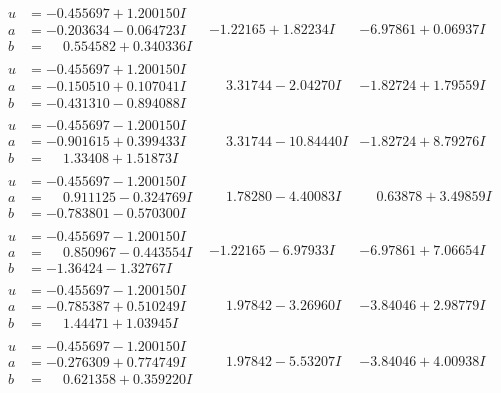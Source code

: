\documentclass[1p]{elsarticle_modified}
\theoremstyle{definition}
\begin{document}
$$\begin{array}{c|c|c}
\begin{aligned}
u &= -0.455697 + 1.200150 I \\
a &= -0.203634 - 0.064723 I \\
b &= \phantom{-}0.554582 + 0.340336 I\end{aligned}
 & -1.22165 + 1.82234 I & -6.97861 + 0.06937 I \\ \hline\begin{aligned}
u &= -0.455697 + 1.200150 I \\
a &= -0.150510 + 0.107041 I \\
b &= -0.431310 - 0.894088 I\end{aligned}
 & \phantom{-}3.31744 - 2.04270 I & -1.82724 + 1.79559 I \\ \hline\begin{aligned}
u &= -0.455697 - 1.200150 I \\
a &= -0.901615 + 0.399433 I \\
b &= \phantom{-}1.33408 + 1.51873 I\end{aligned}
 & \phantom{-}3.31744 - 10.84440 I & -1.82724 + 8.79276 I \\ \hline\begin{aligned}
u &= -0.455697 - 1.200150 I \\
a &= \phantom{-}0.911125 - 0.324769 I \\
b &= -0.783801 - 0.570300 I\end{aligned}
 & \phantom{-}1.78280 - 4.40083 I & \phantom{-}0.63878 + 3.49859 I \\ \hline\begin{aligned}
u &= -0.455697 - 1.200150 I \\
a &= \phantom{-}0.850967 - 0.443554 I \\
b &= -1.36424 - 1.32767 I\end{aligned}
 & -1.22165 - 6.97933 I & -6.97861 + 7.06654 I \\ \hline\begin{aligned}
u &= -0.455697 - 1.200150 I \\
a &= -0.785387 + 0.510249 I \\
b &= \phantom{-}1.44471 + 1.03945 I\end{aligned}
 & \phantom{-}1.97842 - 3.26960 I & -3.84046 + 2.98779 I \\ \hline\begin{aligned}
u &= -0.455697 - 1.200150 I \\
a &= -0.276309 + 0.774749 I \\
b &= \phantom{-}0.621358 + 0.359220 I\end{aligned}
 & \phantom{-}1.97842 - 5.53207 I & -3.84046 + 4.00938 I \\ \hline\begin{aligned}

\end{aligned}
\end{array}$$
\end{document}
